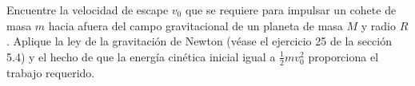 \item Encuentre la velocidad de escape $v_0$ que se requiere para impulsar un cohete de masa $m$ hacia afuera del campo gravitacional de un planeta de masa $M$ y radio $R$. Aplique la ley de la gravitación de Newton (véase el ejercicio 25 de la sección 5.4) y el hecho de que la energía cinética inicial igual a $\frac{1}{2}mv_0^2$ proporciona el trabajo requerido.
